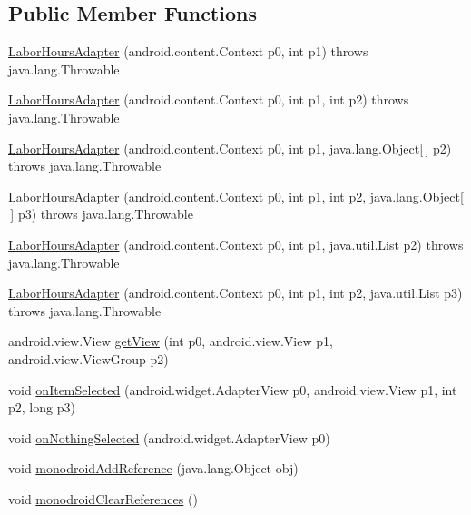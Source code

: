 \subsection*{Public Member Functions}
\begin{DoxyCompactItemize}
\item 
\hyperlink{classfieldservice_1_1android_1_1_labor_hours_adapter_aea61b52d7fcf7e318e5a3b21ca0189e5}{Labor\+Hours\+Adapter} (android.\+content.\+Context p0, int p1)  throws java.\+lang.\+Throwable 	
\item 
\hyperlink{classfieldservice_1_1android_1_1_labor_hours_adapter_a32c141846ce0f4b7e4fd786430e691bb}{Labor\+Hours\+Adapter} (android.\+content.\+Context p0, int p1, int p2)  throws java.\+lang.\+Throwable 	
\item 
\hyperlink{classfieldservice_1_1android_1_1_labor_hours_adapter_a78528a94051b4be5fc3411957dca21da}{Labor\+Hours\+Adapter} (android.\+content.\+Context p0, int p1, java.\+lang.\+Object\mbox{[}$\,$\mbox{]} p2)  throws java.\+lang.\+Throwable 	
\item 
\hyperlink{classfieldservice_1_1android_1_1_labor_hours_adapter_af1169e0ba455e8ac49f7876949807a92}{Labor\+Hours\+Adapter} (android.\+content.\+Context p0, int p1, int p2, java.\+lang.\+Object\mbox{[}$\,$\mbox{]} p3)  throws java.\+lang.\+Throwable 	
\item 
\hyperlink{classfieldservice_1_1android_1_1_labor_hours_adapter_a1f4cd83e1f6423adf35fb37a8b737c60}{Labor\+Hours\+Adapter} (android.\+content.\+Context p0, int p1, java.\+util.\+List p2)  throws java.\+lang.\+Throwable 	
\item 
\hyperlink{classfieldservice_1_1android_1_1_labor_hours_adapter_aa86f206931675a2dfcb48f12938f0364}{Labor\+Hours\+Adapter} (android.\+content.\+Context p0, int p1, int p2, java.\+util.\+List p3)  throws java.\+lang.\+Throwable 	
\item 
android.\+view.\+View \hyperlink{classfieldservice_1_1android_1_1_labor_hours_adapter_a28a6e7b0f8ef16b255119b55be34c020}{get\+View} (int p0, android.\+view.\+View p1, android.\+view.\+View\+Group p2)
\item 
void \hyperlink{classfieldservice_1_1android_1_1_labor_hours_adapter_a24db15d07168d2b58deade14a7c067d5}{on\+Item\+Selected} (android.\+widget.\+Adapter\+View p0, android.\+view.\+View p1, int p2, long p3)
\item 
void \hyperlink{classfieldservice_1_1android_1_1_labor_hours_adapter_a47538661f1eb820f8d70add293b6578f}{on\+Nothing\+Selected} (android.\+widget.\+Adapter\+View p0)
\item 
void \hyperlink{classfieldservice_1_1android_1_1_labor_hours_adapter_ae108aab8fec4c5799d5510b777d7b13b}{monodroid\+Add\+Reference} (java.\+lang.\+Object obj)
\item 
void \hyperlink{classfieldservice_1_1android_1_1_labor_hours_adapter_ad988c67110db52081e55b4ed30feeadb}{monodroid\+Clear\+References} ()
\end{DoxyCompactItemize}


